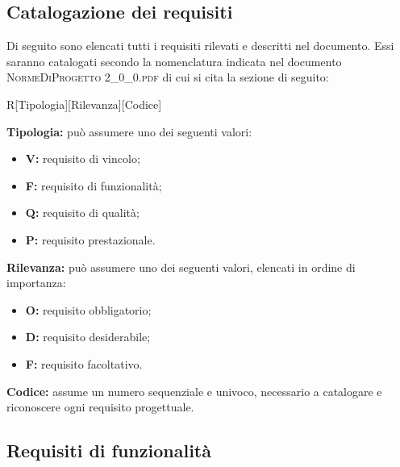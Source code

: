 \subsection{Catalogazione dei requisiti}

Di seguito sono elencati tutti i requisiti rilevati e descritti nel documento. Essi saranno catalogati secondo la nomenclatura indicata nel documento \textsc{NormeDiProgetto 2\_0\_0.pdf} di cui si cita la sezione di seguito:

\begin{center}
	R[Tipologia][Rilevanza][Codice]
\end{center}
\textbf{Tipologia:} può assumere uno dei seguenti valori:
\begin{itemize}
	\item \textbf{V:} requisito di vincolo;
	\item \textbf{F:} requisito di funzionalità;
	\item \textbf{Q:} requisito di qualità;
	\item \textbf{P:} requisito prestazionale.
\end{itemize}
\textbf{Rilevanza:} può assumere uno dei seguenti valori, elencati in ordine di importanza:
\begin{itemize}
	\item \textbf{O:} requisito obbligatorio;
	\item \textbf{D:} requisito desiderabile;
	\item \textbf{F:} requisito facoltativo.
\end{itemize}
\textbf{Codice:} assume un numero sequenziale e univoco, necessario a catalogare e riconoscere ogni requisito progettuale.

\subsection{Requisiti di funzionalità}


